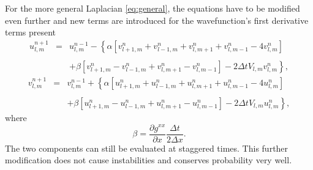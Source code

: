 For the more general Laplacian \eqref{eq:general}, the equations have to
be modified even further and new terms are introduced for the
wavefunction's first derivative terms present
\begin{equation}
\begin{array}{lcl}
u^{n+1}_{l,m} & = & u^{n-1}_{l,m} - \left\{ \alpha \left[ v^n_{l+1,m}
  + v^n_{l-1,m} + v^n_{l,m+1} + v^n_{l,m-1} -
  4v^n_{l,m} \right] \right. \\\\ & & \left. + \beta \left[ v^n_{l+1,m} -
  v^n_{l-1,m} + v^n_{l, m+1} - v^n_{l, m-1} \right] - 2
\Delta t V_{l,m}v^n_{l,m} \right\} ,
\end{array}
\end{equation}
\begin{equation}
\begin{array}{lcl}
v^{n+1}_{l,m} & = & v^{n-1}_{l,m} + \left\{ \alpha \left[ u^n_{l+1,m}
  + u^n_{l-1,m} + u^n_{l,m+1} + u^n_{l,m-1} -
  4u^n_{l,m} \right] \right. \\\\ & & \left. + \beta \left[
  u^n_{l+1,m} - u^n_{l-1,m} + u^n_{l, m+1} - u^n_{l, m-1} \right] - 2
\Delta t V_{l,m}u^n_{l,m} \right\},
\end{array}
\end{equation}
where
\begin{equation}
\beta = \frac{\partial g^{xx}}{\partial x} \frac{\Delta t}{2 \Delta x}.
\end{equation}
The two components can still be evaluated at staggered times. This
further modification does not cause instabilities and conserves
probability very well.
